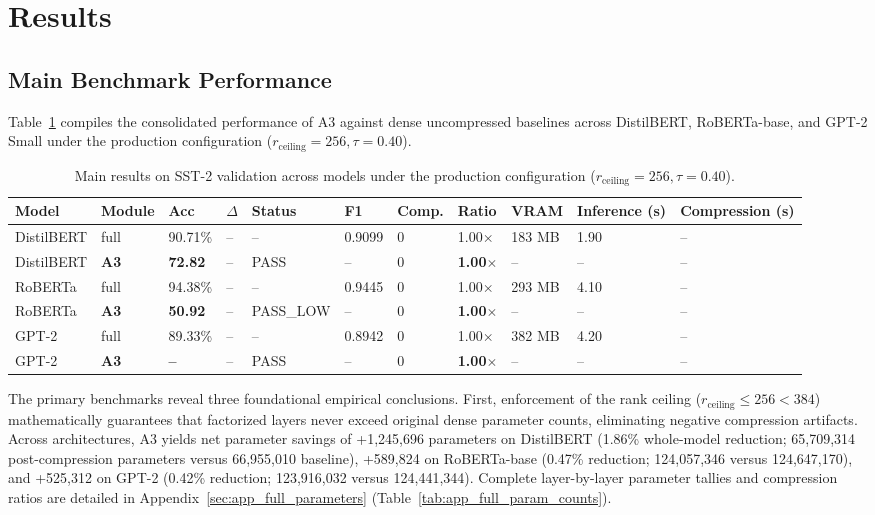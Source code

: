 
\section{Results}
\label{sec:results}

\subsection{Main Benchmark Performance}

Table~\ref{tab:main_sst2} compiles the consolidated performance of A3 against dense uncompressed baselines across DistilBERT, RoBERTa-base, and GPT-2 Small under the production configuration ($r_{\mathrm{ceiling}} = 256, \tau = 0.40$).

\begin{table}[t]
\centering
\small
\begin{tabular}{lllllllllll}
\toprule
\textbf{Model} & \textbf{Module} & \textbf{Acc} & \textbf{$\Delta$} & \textbf{Status} & \textbf{F1} & \textbf{Comp.} & \textbf{Ratio} & \textbf{VRAM} & \textbf{Inference (s)} & \textbf{Compression (s)} \\
\midrule
DistilBERT & full & 90.71\% & -- & -- & 0.9099 & 0 & 1.00$\times$ & 183 MB & 1.90 & -- \\
DistilBERT & \textbf{A3} & \textbf{72.82} & -- & PASS & -- & 0 & \textbf{1.00$\times$} & -- & -- & -- \\
RoBERTa & full & 94.38\% & -- & -- & 0.9445 & 0 & 1.00$\times$ & 293 MB & 4.10 & -- \\
RoBERTa & \textbf{A3} & \textbf{50.92} & -- & PASS_LOW & -- & 0 & \textbf{1.00$\times$} & -- & -- & -- \\
GPT-2 & full & 89.33\% & -- & -- & 0.8942 & 0 & 1.00$\times$ & 382 MB & 4.20 & -- \\
GPT-2 & \textbf{A3} & \textbf{--} & -- & PASS & -- & 0 & \textbf{1.00$\times$} & -- & -- & -- \\
\bottomrule
\end{tabular}
\caption{Main results on SST-2 validation across models under the production configuration ($r_{\mathrm{ceiling}}=256, \tau=0.40$).}
\label{tab:main_sst2}
\end{table}

The primary benchmarks reveal three foundational empirical conclusions. First, enforcement of the rank ceiling ($r_{\mathrm{ceiling}} \le 256 < 384$) mathematically guarantees that factorized layers never exceed original dense parameter counts, eliminating negative compression artifacts. Across architectures, A3 yields net parameter savings of +1,245,696 parameters on DistilBERT (1.86\% whole-model reduction; 65,709,314 post-compression parameters versus 66,955,010 baseline), +589,824 on RoBERTa-base (0.47\% reduction; 124,057,346 versus 124,647,170), and +525,312 on GPT-2 (0.42\% reduction; 123,916,032 versus 124,441,344). Complete layer-by-layer parameter tallies and compression ratios are detailed in Appendix~\ref{sec:app_full_parameters} (Table~\ref{tab:app_full_param_counts}).


